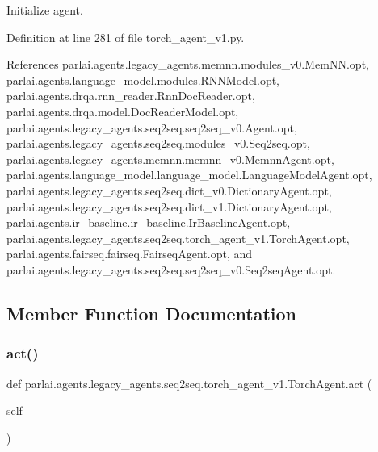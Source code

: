 \begin{DoxyVerb}Initialize agent.\end{DoxyVerb}
 

Definition at line 281 of file torch\+\_\+agent\+\_\+v1.\+py.



References parlai.\+agents.\+legacy\+\_\+agents.\+memnn.\+modules\+\_\+v0.\+Mem\+N\+N.\+opt, parlai.\+agents.\+language\+\_\+model.\+modules.\+R\+N\+N\+Model.\+opt, parlai.\+agents.\+drqa.\+rnn\+\_\+reader.\+Rnn\+Doc\+Reader.\+opt, parlai.\+agents.\+drqa.\+model.\+Doc\+Reader\+Model.\+opt, parlai.\+agents.\+legacy\+\_\+agents.\+seq2seq.\+seq2seq\+\_\+v0.\+Agent.\+opt, parlai.\+agents.\+legacy\+\_\+agents.\+seq2seq.\+modules\+\_\+v0.\+Seq2seq.\+opt, parlai.\+agents.\+legacy\+\_\+agents.\+memnn.\+memnn\+\_\+v0.\+Memnn\+Agent.\+opt, parlai.\+agents.\+language\+\_\+model.\+language\+\_\+model.\+Language\+Model\+Agent.\+opt, parlai.\+agents.\+legacy\+\_\+agents.\+seq2seq.\+dict\+\_\+v0.\+Dictionary\+Agent.\+opt, parlai.\+agents.\+legacy\+\_\+agents.\+seq2seq.\+dict\+\_\+v1.\+Dictionary\+Agent.\+opt, parlai.\+agents.\+ir\+\_\+baseline.\+ir\+\_\+baseline.\+Ir\+Baseline\+Agent.\+opt, parlai.\+agents.\+legacy\+\_\+agents.\+seq2seq.\+torch\+\_\+agent\+\_\+v1.\+Torch\+Agent.\+opt, parlai.\+agents.\+fairseq.\+fairseq.\+Fairseq\+Agent.\+opt, and parlai.\+agents.\+legacy\+\_\+agents.\+seq2seq.\+seq2seq\+\_\+v0.\+Seq2seq\+Agent.\+opt.



\subsection{Member Function Documentation}
\mbox{\label{classparlai_1_1agents_1_1legacy__agents_1_1seq2seq_1_1torch__agent__v1_1_1TorchAgent_a3ab251071823f34358a569c1c2a11bf9}} 
\subsubsection{\texorpdfstring{act()}{act()}}
{\footnotesize\ttfamily def parlai.\+agents.\+legacy\+\_\+agents.\+seq2seq.\+torch\+\_\+agent\+\_\+v1.\+Torch\+Agent.\+act (\begin{DoxyParamCaption}\item[{}]{self }\end{DoxyParamCaption})}

